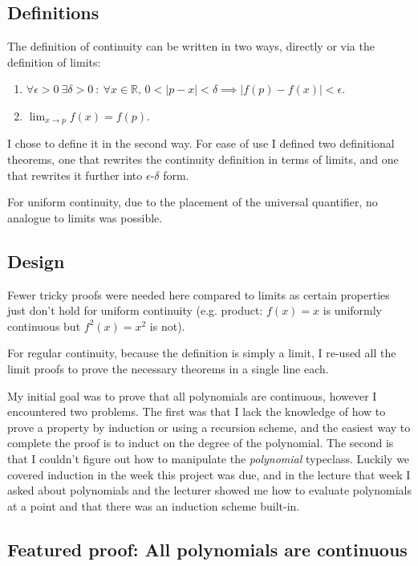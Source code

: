 \documentclass[a4paper, twoside, 11pt]{article}
\theoremstyle{definition}
\theoremstyle{plain}
\theoremstyle{remark}
\begin{document}
\subsection*{Definitions}

The definition of continuity can be written in two ways, directly or via the definition of limits:

\begin{enumerate}
    \item $\forall \epsilon > 0\ \exists \delta > 0\ :\ \forall x \in \mathbb{R},\, 0 < |p - x| < \delta \implies |f(p) - f(x)| < \epsilon$.
    \item $\lim_{x \to p} f(x) = f(p)$.
\end{enumerate}

I chose to define it in the second way. For ease of use I defined two definitional theorems, one that rewrites the continuity definition in terms of limits, and one that rewrites it further into $\epsilon$-$\delta$ form.

For uniform continuity, due to the placement of the universal quantifier, no analogue to limits was possible.

\subsection*{Design}

Fewer tricky proofs were needed here compared to limits as certain properties just don't hold for uniform continuity (e.g. product: $f(x) = x$ is uniformly continuous but $f^{2}(x) = x^{2}$ is not).

For regular continuity, because the definition is simply a limit, I re-used all the limit proofs to prove the necessary theorems in a single line each.

My initial goal was to prove that all polynomials are continuous, however I encountered two problems. The first was that I lack the knowledge of how to prove a property by induction or using a recursion scheme, and the easiest way to complete the proof is to induct on the degree of the polynomial. The second is that I couldn't figure out how to manipulate the \emph{polynomial} typeclass. Luckily we covered induction in the week this project was due, and in the lecture that week I asked about polynomials and the lecturer showed me how to evaluate polynomials at a point and that there was an induction scheme built-in.

\subsection*{Featured proof: All polynomials are continuous}
\end{document}
